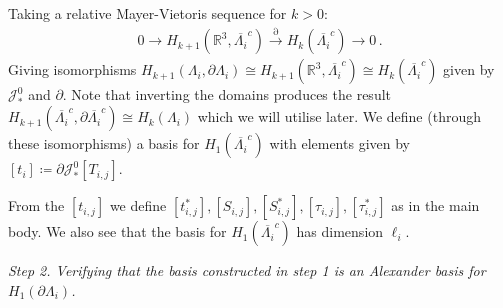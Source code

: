 \documentclass[11pt]{article}
\theoremstyle{plain}
\theoremstyle{definition}
\theoremstyle{remark}
\newcommand{\R}{\mathbb{R}}
\newcommand{\ST}{\Lambda}
\begin{document}
Taking a relative Mayer-Vietoris sequence for \(k>0\):
\begin{align*}
      0 
    \to  H_{k+1} (\R^3, \overline{\ST_i}^c )
    \xrightarrow{\partial}   H_{k} (\overline{\ST_i}^c ) 
    \to  0 \, .
\end{align*}
Giving isomorphisms \(H_{k+1} (\ST_i, \partial \ST_i) \cong H_{k+1} (\R^3 , \overline{\ST_i}^c) \cong H_{k} (\overline{\ST_i}^c ) \) given by \( \mathcal{J}^0_*\) and \(\partial\). Note that inverting the domains produces the result \(H_{k+1} (\overline{\ST_i}^c, \partial \overline{\ST_i}^c) \cong H_{k} (\ST_i ) \) which we will utilise later. We define (through these isomorphisms) a basis for \(H_{1} (\overline{\ST_i}^c )\) with elements given by \([t_i] \coloneqq \partial \mathcal{J}^0_* [T_{i, j}]  \). 


From the \([t_{i,j}]\) we define \([t_{i,j}^*], [S_{i,j}], [S_{i,j}^*], [\tau_{i,j}], [\tau_{i,j}^*]\) as in the main body. We also see that the basis for \(H_{1} (\overline{\ST_i}^c )\) has dimension \(\ell_i\). 



\bigskip 

\textit{Step 2. Verifying that the basis constructed in step 1 is an Alexander basis for \(H_1(\partial \ST_i)\).}
\end{document}
